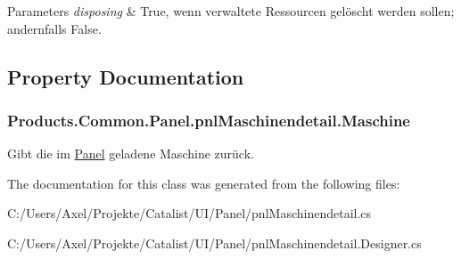 \begin{DoxyParams}{Parameters}
{\em disposing} & True, wenn verwaltete Ressourcen gelöscht werden sollen; andernfalls False.\\
\hline
\end{DoxyParams}


\subsection{Property Documentation}
\subsubsection[{\texorpdfstring{Maschine}{Maschine}}]{ Products.\+Common.\+Panel.\+pnl\+Maschinendetail.\+Maschine\hspace{0.3cm}{\ttfamily [get]}}\hypertarget{class_products_1_1_common_1_1_panel_1_1pnl_maschinendetail_a27e4a729a66a2efd6f6441f793e7d60c}{}\label{class_products_1_1_common_1_1_panel_1_1pnl_maschinendetail_a27e4a729a66a2efd6f6441f793e7d60c}


Gibt die im \hyperlink{namespace_products_1_1_common_1_1_panel}{Panel} geladene Maschine zurück. 



The documentation for this class was generated from the following files\+:\begin{DoxyCompactItemize}
\item 
C\+:/\+Users/\+Axel/\+Projekte/\+Catalist/\+U\+I/\+Panel/pnl\+Maschinendetail.\+cs\item 
C\+:/\+Users/\+Axel/\+Projekte/\+Catalist/\+U\+I/\+Panel/pnl\+Maschinendetail.\+Designer.\+cs\end{DoxyCompactItemize}
